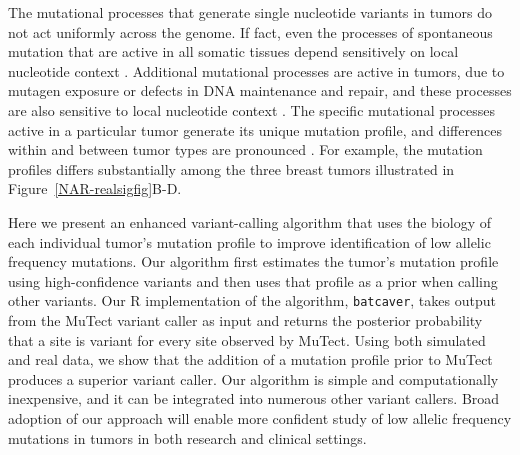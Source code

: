 \documentclass[a4,center,fleqn]{NAR}
\begin{document}
The mutational processes that generate single nucleotide variants in tumors do not act uniformly across the genome.
If fact, even the processes of spontaneous mutation that are active in all somatic tissues depend sensitively on local nucleotide context \citep{Nik-Zainal2012a,Alexandrov2015,Lee-Six2018}. 
Additional mutational processes are active in tumors, due to mutagen exposure or defects in DNA maintenance and repair, and these processes are also sensitive to local nucleotide context \citep{Alexandrov2013a,Helleday2014a,Nik-Zainal2016,Kandoth2013,Alexandrov2016}.
The specific mutational processes active in a particular tumor generate its unique mutation profile, and differences within and between tumor types are pronounced \cite{Stephens2005, Burrell2013a, Nakamura2015, Witkiewicz2015, Kumar2016}.
For example, the mutation profiles differs substantially among the three breast tumors illustrated in Figure~\ref{NAR-realsigfig}B-D.

Here we present an enhanced variant-calling algorithm that uses the biology of each individual tumor's mutation profile to improve identification of low allelic frequency mutations.
Our algorithm first estimates the tumor's mutation profile using high-confidence variants and then uses that profile as a prior when calling other variants.
Our R implementation of the algorithm, \texttt{batcaver}, takes output from the MuTect variant caller as input and returns the posterior probability that a site is variant for every site observed by MuTect.
Using both simulated and real data, we show that the addition of a mutation profile prior to MuTect produces a superior variant caller.
Our algorithm is simple and computationally inexpensive, and it can be integrated into numerous other variant callers.
Broad adoption of our approach will enable more confident study of low allelic frequency mutations in tumors in both research and clinical settings.
\end{document}
